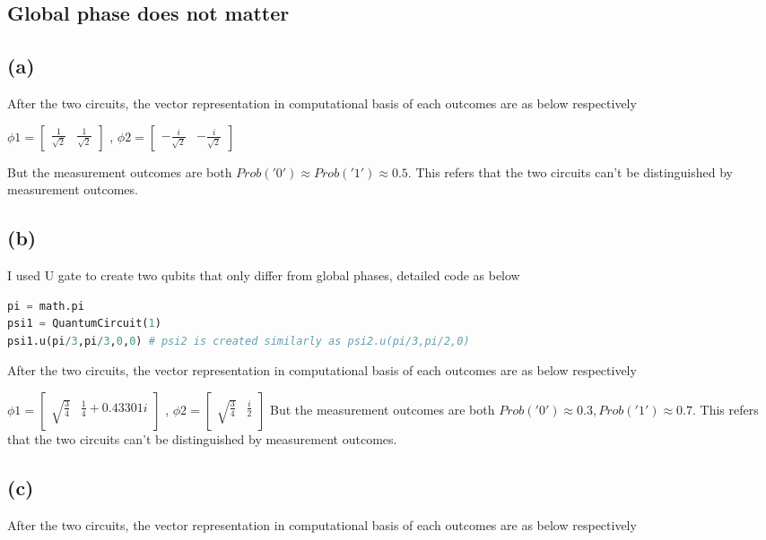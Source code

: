 \documentclass{article}
\begin{document}
\begin{CJK*}{UTF8}{bsmi}
\section{Global phase does not matter}
\subsection{(a)}
After the two circuits, the vector representation in computational basis of each outcomes are as below respectively

$\phi1 = \begin{bmatrix}
    \frac{1}{\sqrt{2}} & \frac{1}{\sqrt{2}} 
    \end{bmatrix}$
, $\phi2 = \begin{bmatrix}
    -\frac{i}{\sqrt{2}} & -\frac{i}{\sqrt{2}} 
    \end{bmatrix}$
    
But the measurement outcomes are both $Prob('0') \approx Prob('1') \approx 0.5$. This refers that the two circuits can't be distinguished by measurement outcomes.

\subsection{(b)}
I used U gate to create two qubits that only differ from global phases, detailed code as below
\begin{lstlisting}[language=Python]
pi = math.pi
psi1 = QuantumCircuit(1)
psi1.u(pi/3,pi/3,0,0) # psi2 is created similarly as psi2.u(pi/3,pi/2,0)
\end{lstlisting}
After the two circuits, the vector representation in computational basis of each outcomes are as below respectively

$\phi1 = \begin{bmatrix}
    \sqrt{\frac{3}{4}} & \frac{1}{4}+0.43301i 
    \end{bmatrix}$
, $\phi2 = \begin{bmatrix}
    \sqrt{\frac{3}{4}} & \frac{i}{2} 
    \end{bmatrix}$
But the measurement outcomes are both $Prob('0') \approx 0.3, Prob('1') \approx 0.7$. This refers that the two circuits can't be distinguished by measurement outcomes.
\subsection{(c)}
After the two circuits, the vector representation in computational basis of each outcomes are as below respectively


\end{CJK*}
\end{document}
